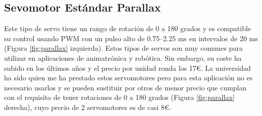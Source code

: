 \setcounter{footnote}{35} %


\subsection{Sevomotor Estándar Parallax}
Este tipo de servo tiene un rango de rotación de 0 a 180 grados y es compatible su control usando \ac{PWM} con un pulso alto de 0.75–2.25 ms en intervalos de 20 ms (Figura \ref{fig:parallax} izquierda). Estos tipos de servos son muy comunes para utilizar en aplicaciones de animatrónica y robótica. Sin embargo, su coste ha subido en los últimos años y el precio por unidad ronda los 17€. La universidad ha sido quien me ha prestado estos servomotores pero para esta aplicación no es necesario usarlos y se pueden sustituir por otros de menor precio que cumplan con el requisito de tener rotaciones de 0 a 180 grados (Figura \ref{fig:parallax} derecha), cuyo precio de 2 servomotores es de casi 8€. 


